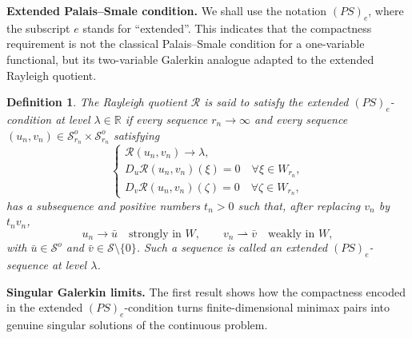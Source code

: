 \documentclass[preprint,10pt]{elsarticle}
\numberwithin{equation}{section}
\newtheorem{defi}[thm]{Definition}
\begin{document}
\medskip
\medskip
\noindent\textbf{Extended Palais--Smale condition.}
We shall use the notation \((PS)_e\), where the subscript \(e\) stands for
``extended''. This indicates that the compactness requirement is not the
classical Palais--Smale condition for a one-variable functional, but its
two-variable Galerkin analogue adapted to the extended Rayleigh quotient.



\begin{defi}
	The Rayleigh quotient \(\mathcal R\) is said to satisfy the extended
	\((PS)_e\)-condition at level \(\lambda\in\mathbb R\) if every sequence
	\(r_n\to\infty\) and every sequence
	\((u_n,v_n)\in\mathcal S_{r_n}^o\times\mathcal S_{r_n}^o\) satisfying
	\begin{equation}\label{PSEcond}
		\begin{cases}
			\mathcal R(u_n,v_n)\to\lambda,\\
			D_u\mathcal R(u_n,v_n)(\xi)=0
			\quad \forall \xi\in W_{r_n},\\
			D_v\mathcal R(u_n,v_n)(\zeta)=0
			\quad \forall \zeta\in W_{r_n},
		\end{cases}
	\end{equation}
	has a subsequence and positive numbers \(t_n>0\) such that, after replacing
	\(v_n\) by \(t_nv_n\),
	\[
	u_n\to\bar u \quad\text{strongly in }W,
	\qquad
	v_n\rightharpoonup\bar v \quad\text{weakly in }W,
	\]
	with \(\bar u\in\mathcal S^o\) and
	\(\bar v\in\mathcal S\setminus\{0\}\). Such a sequence is called an
	extended \((PS)_e\)-sequence at level \(\lambda\).
\end{defi}


\medskip
\noindent\textbf{Singular Galerkin limits.}
The first result shows how the compactness encoded in the extended
\((PS)_e\)-condition turns finite-dimensional minimax pairs into genuine
singular solutions of the continuous problem.
\end{document}
